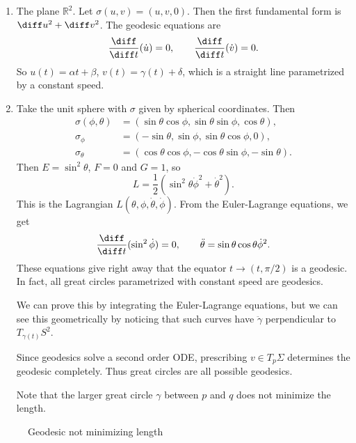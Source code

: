 \documentclass[12pt]{article}
\begin{document}
\begin{exbox}
	\begin{enumerate}
		\item The plane $\mathbb{R}^2$. Let $\sigma(u, v) = (u, v, 0)$. Then the first fundamental form is $\diff u^2 + \diff v^2$. The geodesic equations are
			\[
			\frac{\diff}{\diff t}(\dot u) = 0, \qquad \frac{\diff}{\diff t} (\dot v) = 0.
			\]
			So $u(t) = \alpha t + \beta$, $v(t) = \gamma(t) + \delta$, which is a straight line parametrized by a constant speed.
		\item Take the unit sphere with $\sigma$ given by spherical coordinates. Then
			\begin{align*}
				\sigma(\phi, \theta) &= (\sin \theta \cos \phi, \sin \theta \sin \phi, \cos \theta), \\
				\sigma_\phi &= (- \sin \theta, \sin \phi, \sin \theta \cos \phi, 0), \\
				\sigma_{\theta} &= (\cos \theta \cos \phi, - \cos \theta \sin \phi, - \sin \theta).
			\end{align*}
			Then $E = \sin^2\theta$, $F = 0$ and $G = 1$, so
			\[
			L = \frac{1}{2} (\sin^2 \theta \dot \phi^2 + \dot \theta^2).
			\]
			This is the Lagrangian $L(\theta, \phi, \dot \theta, \dot \phi)$. From the Euler-Lagrange equations, we get
			\[
			\frac{\diff}{\diff t}(\sin^2 \dot \phi) = 0, \qquad \ddot \theta = \sin \theta \cos \theta \dot \phi^2.
			\]
			These equations give right away that the equator $t \to (t, \pi/2)$ is a geodesic. In fact, all great circles parametrized with constant speed are geodesics.

			We can prove this by integrating the Euler-Lagrange equations, but we can see this geometrically by noticing that such curves have $\ddot \gamma$ perpendicular to $T_{\gamma(t)}S^2$.

			Since geodesics solve a second order ODE, prescribing $v \in T_p\Sigma$ determines the geodesic completely. Thus great circles are all possible geodesics.

			Note that the larger great circle $\gamma$ between $p$ and $q$ does not minimize the length.
	\end{enumerate}
\end{exbox}

\begin{figure}[h]
	\centering
	\caption{Geodesic not minimizing length}
	\label{fig:long_geodesic}
\end{figure}

\newpage

\printindex
\end{document}
